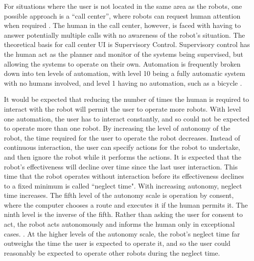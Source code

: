 For situations where the user is not located in the same area as the robots, one possible approach is a ``call center'', where robots can request human attention when required \citep{chen2011supervisory}. 
The human in the call center, however, is faced with having to answer potentially multiple calls with no awareness of the robot's situation. 
The theoretical basis for call center UI is Supervisory Control. 
Supervisory control has the human act as the planner and monitor of the systems being supervised, but allowing the systems to operate on their own.
Automation is frequently broken down into ten levels of automation, with level 10 being a fully automatic system with no humans involved, and level 1 having no automation, such as a bicycle \citep{parasuraman2000model}. 

It would be expected that reducing the number of times the human is required to interact with the robot will permit the user to operate more robots.
With level one automation, the user has to interact constantly, and so could not be expected to operate more than one robot. 
By increasing the level of autonomy of the robot, the time required for the user to operate the robot decreases.
Instead of continuous interaction, the user can specify actions for the robot to undertake, and then ignore the robot while it performs the actions.
It is expected that the robot's effectiveness will decline over time since the last user interaction. 
This time that the robot operates without interaction before its effectiveness declines to a fixed minimum is called ``neglect time"\citep{olsen2003metrics}.
With increasing autonomy, neglect time increases.
The fifth level of the autonomy scale is operation by consent, where the computer chooses a route and executes it if the human permits it. 
The ninth level is the inverse of the fifth.
Rather than asking the user for consent to act, the robot acts autonomously and informs the human only in exceptional cases. . 
At the higher levels of the autonomy scale, the robot's neglect time far outweighs the time the user is expected to operate it, and so the user could reasonably be expected to operate other robots during the neglect time. 

